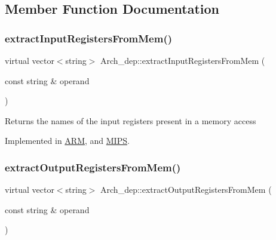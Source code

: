 \subsection{Member Function Documentation}
\mbox{\label{classArch__dep_a02bb8952fdf52e2a11ca009509b7bf46}} 
\subsubsection{\texorpdfstring{extract\+Input\+Registers\+From\+Mem()}{extractInputRegistersFromMem()}}
{\footnotesize\ttfamily virtual vector$<$string$>$ Arch\+\_\+dep\+::extract\+Input\+Registers\+From\+Mem (\begin{DoxyParamCaption}\item[{const string \&}]{operand }\end{DoxyParamCaption})\hspace{0.3cm}{\ttfamily [pure virtual]}}

Returns the names of the input registers present in a memory access 

Implemented in \hyperlink{classARM_a9e3c7c33a89377beca2b31ebacf2793c}{A\+RM}, and \hyperlink{classMIPS_acf8659c9a36074bbe47455275a4829f7}{M\+I\+PS}.

\mbox{\label{classArch__dep_a4ef649eb06dedb67fe215fc7665f48ba}} 
\subsubsection{\texorpdfstring{extract\+Output\+Registers\+From\+Mem()}{extractOutputRegistersFromMem()}}
{\footnotesize\ttfamily virtual vector$<$string$>$ Arch\+\_\+dep\+::extract\+Output\+Registers\+From\+Mem (\begin{DoxyParamCaption}\item[{const string \&}]{operand }\end{DoxyParamCaption})\hspace{0.3cm}{\ttfamily [pure virtual]}}

